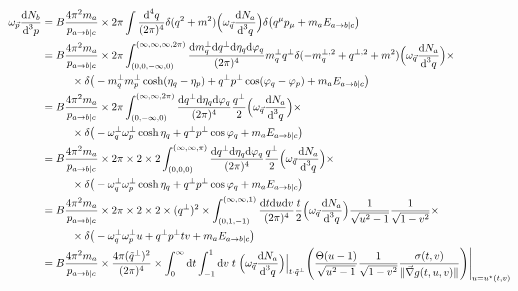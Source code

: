 \begin{subequations}
    \begin{align}
        \omega_{\vec{p}}\frac{\text{d} N_b}{\text{d}^3p}&=B\frac{4\pi^2m_a}{p_{a\rightarrow b\vert c}}\times2\pi\int\frac{\text{d}^4q}{(2\pi)^4}\delta(q^2+m^2)\Big(\omega_{\vec{q}}\frac{\text{d} N_a}{\text{d}^3 q}\Big)\delta\big(q^\mu p_\mu+m_a E_{a\rightarrow b\vert c}\big)\\
        &=B\frac{4\pi^2m_a}{p_{a\rightarrow b\vert c}}\times2\pi\int_{(0,0,-\infty,0)}^{(\infty,\infty,\infty,2\pi)}\frac{\text{d} m_q^\perp \text{d} q^\perp\text{d}\eta_q\text{d}\varphi_q}{(2\pi)^4}m_q^\perp q^\perp\delta(-m_q^{\perp,2}+q^{\perp,2}+m^2)\Big(\omega_{\vec{q}}\frac{\text{d} N_a}{\text{d}^3 q}\Big)\times\nonumber\\
        &\phantom{=}\qquad\times\delta\big(-m_q^\perp m_p^\perp\cosh(\eta_q-\eta_p)+q^\perp p^\perp\cos(\varphi_q-\varphi_p)+m_a E_{a\rightarrow b\vert c}\big)\\
        &=B\frac{4\pi^2m_a}{p_{a\rightarrow b\vert c}}\times2\pi\int_{(0,-\infty,0)}^{(\infty,\infty,2\pi)}\frac{\text{d} q^\perp\text{d}\eta_q\text{d}\varphi_q}{(2\pi)^4}\frac{q^\perp}{2}\Big(\omega_{\vec{q}}\frac{\text{d} N_a}{\text{d}^3 q}\Big)\times\nonumber\\
        &\phantom{=}\qquad\times\delta\big(-\omega_q^\perp \omega_p^\perp\cosh\eta_q+q^\perp p^\perp\cos\varphi_q+m_a E_{a\rightarrow b\vert c}\big)\\
        &=B\frac{4\pi^2m_a}{p_{a\rightarrow b\vert c}}\times2\pi\times 2\times 2\int_{(0,0,0)}^{(\infty,\infty,\pi)}\frac{\text{d} q^\perp\text{d}\eta_q\text{d}\varphi_q}{(2\pi)^4}\frac{q^\perp}{2}\Big(\omega_{\vec{q}}\frac{\text{d} N_a}{\text{d}^3 q}\Big)\times\nonumber\\
        &\phantom{=}\qquad\times\delta\big(-\omega_q^\perp \omega_p^\perp\cosh\eta_q+q^\perp p^\perp\cos\varphi_q+m_a E_{a\rightarrow b\vert c}\big)\\
        &=B\frac{4\pi^2m_a}{p_{a\rightarrow b\vert c}}\times2\pi\times 2\times 2\times(q^\perp)^2\times\int_{(0,1,-1)}^{(\infty,\infty,1)}\frac{\text{d} t\text{d} u\text{d} v}{(2\pi)^4}\frac{t}{2}\Big(\omega_{\vec{q}}\frac{\text{d} N_a}{\text{d}^3 q}\Big)\frac{1}{\sqrt{u^2-1}}\frac{1}{\sqrt{1-v^2}}\times\nonumber\\
        &\phantom{=}\qquad\times\delta\big(-\omega_q^\perp \omega_p^\perp u+q^\perp p^\perp tv+m_a E_{a\rightarrow b\vert c}\big)\\
        &=B\frac{4\pi^2m_a}{p_{a\rightarrow b\vert c}}\times\frac{4\pi(\tilde{q}^\perp)^2}{(2\pi)^4}\times\int_0^\infty\text{d} t\int_{-1}^1\text{d} v\;t\;\Big(\omega_{\vec{q}}\frac{\text{d} N_a}{\text{d}^3 q}\Big)\Big\vert_{t\cdot \tilde{q}^\perp }\Bigg(\frac{\Theta(u-1)}{\sqrt{u^2-1}}\frac{1}{\sqrt{1-v^2}}\frac{\sigma(t,v)}{\Vert\vec{\nabla}g(t,u,v)\Vert}\Bigg)\Bigg\vert_{u=u^\star(t,v)}        
    \end{align}
\end{subequations}
